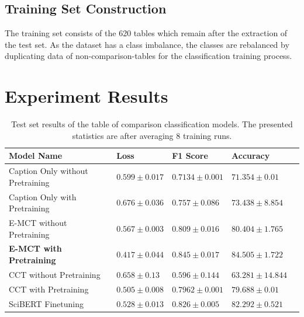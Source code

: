 \subsection{Training Set Construction}
The training set consists of the 620 tables which remain after the extraction of the test set. As the dataset has a class imbalance, the classes are rebalanced by duplicating data of non-comparison-tables for the classification training process. 

\section{Experiment Results}
\label{table_classification:experiment-result}

\begin{table}[h]
    \label{table\arabic{tablecounter}}
    \centering
    \begin{tabular}{llllr}
        \toprule
                         Model Name &                 Loss &             F1 Score &               Accuracy \\
        \midrule
          Caption Only without Pretraining &  $ 0.599 \pm 0.017 $ &    $ 0.7134 \pm 0.001 $ &     $ 71.354 \pm 0.01 $ \\
          Caption Only with Pretraining  &  $ 0.676 \pm 0.036 $ &  $ 0.757 \pm 0.086 $ &   $ 73.438 \pm 8.854 $ \\
          E-MCT without Pretraining &  $ 0.567 \pm 0.003 $ &  $ 0.809 \pm 0.016 $ &   $ 80.404 \pm 1.765 $ \\
          \textbf{E-MCT with Pretraining} &  $ \mathbf{0.417 \pm 0.044} $ &  $ \mathbf{0.845 \pm 0.017}$ &  $\mathbf{84.505 \pm 1.722}$ \\
          CCT without Pretraining &   $ 0.658 \pm 0.13 $ &  $ 0.596 \pm 0.144 $ &  $ 63.281 \pm 14.844 $ \\
          CCT with Pretraining &  $ 0.505 \pm 0.008 $ &    $ 0.7962 \pm 0.001 $ &     $ 79.688 \pm 0.01 $ \\
          SciBERT Finetuning &  $ 0.528 \pm 0.013 $ &  $ 0.826 \pm 0.005 $ &   $ 82.292 \pm 0.521 $ \\
        \bottomrule
    \end{tabular}
    \caption{Test set results of the table of comparison classification models. The presented statistics are after averaging 8 training runs. }
\end{table}

